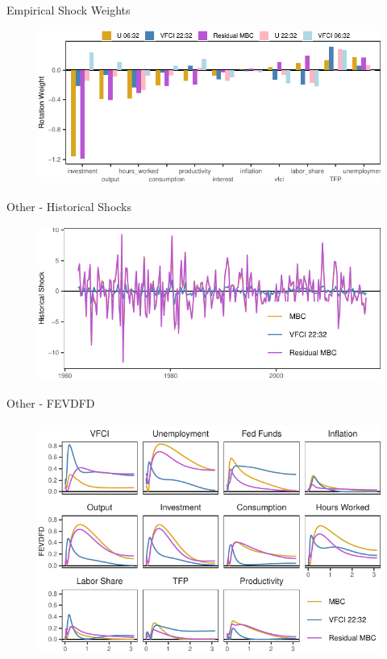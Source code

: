 \begin{frame}{Empirical Shock Weights }
    
    \vspace{-0.25cm}
    
    \begin{figure}
        \includegraphics[height = 2in]{figs/fig11_emp_weights.pdf}
    \end{figure}

\end{frame}


\begin{frame}{Other - Historical Shocks }
    
    \vspace{-0.25cm}

    \begin{figure}
        \includegraphics[height = 2in]{figs/fig8_hist_shocks.pdf}
    \end{figure}

\end{frame}


\begin{frame}{Other - FEVDFD }
    
    \vspace{-0.25cm}
    
    \begin{figure}
        \includegraphics[height = 3in]{figs/fig9_fevdfd.pdf}
    \end{figure}

\end{frame}


